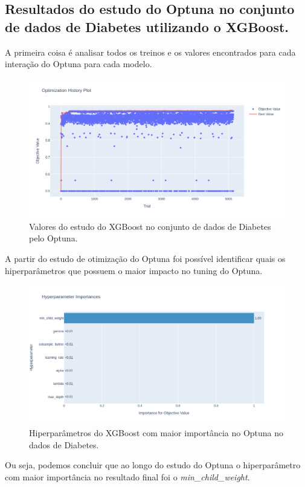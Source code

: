 \subsection{Resultados do estudo do Optuna no conjunto de dados de Diabetes utilizando o XGBoost.}
A primeira coisa é analisar todos os treinos e os valores encontrados para cada interação do Optuna para cada modelo.
\begin{figure}[H]
 \caption{Valores do estudo do XGBoost no conjunto de dados de Diabetes pelo Optuna.}
 \label{fig:op:dia:trials:xgb}
 \centering
 \includegraphics[scale=0.4]{images/optuna_xgboost_dia.png}
\end{figure}
A partir do estudo de otimização do Optuna foi possível identificar quais os hiperparâmetros que possuem o maior impacto no tuning do Optuna.
\begin{figure}[H]
 \caption{Hiperparâmetros do XGBoost com maior importância no Optuna no dados de Diabetes.}
 \label{fig:op:dia:impo:xgb}
 \centering
 \includegraphics[scale=0.4]{images/importance_xgboost_dia.png}
\end{figure}
Ou seja, podemos concluir que ao longo do estudo do Optuna o hiperparâmetro com maior importância no resultado final foi o \textit{min\_child\_weight}.

